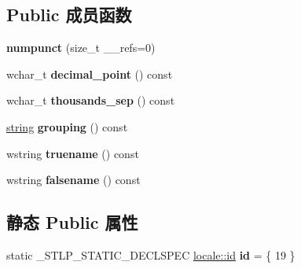 \subsection*{Public 成员函数}
\begin{DoxyCompactItemize}
\item 
\mbox{\label{classnumpunct_3_01wchar__t_01_4_a9940e35fb4fe67518dcb2ca24e023705}} 
{\bfseries numpunct} (size\+\_\+t \+\_\+\+\_\+refs=0)
\item 
\mbox{\label{classnumpunct_3_01wchar__t_01_4_a944a467d9a4a1d7c00e23ce2c0ad4da2}} 
wchar\+\_\+t {\bfseries decimal\+\_\+point} () const
\item 
\mbox{\label{classnumpunct_3_01wchar__t_01_4_ac67e3c8e73720e09c9d769c9a9d20077}} 
wchar\+\_\+t {\bfseries thousands\+\_\+sep} () const
\item 
\mbox{\label{classnumpunct_3_01wchar__t_01_4_a3029159f559230963236c4203cda9011}} 
\hyperlink{structstring}{string} {\bfseries grouping} () const
\item 
\mbox{\label{classnumpunct_3_01wchar__t_01_4_a66bfd5912c7beb5673ac2fb90b89c521}} 
wstring {\bfseries truename} () const
\item 
\mbox{\label{classnumpunct_3_01wchar__t_01_4_a9b58c525e17ce8534a2f0da1a0e833e6}} 
wstring {\bfseries falsename} () const
\end{DoxyCompactItemize}
\subsection*{静态 Public 属性}
\begin{DoxyCompactItemize}
\item 
\mbox{\label{classnumpunct_3_01wchar__t_01_4_a7068f9a6ad1847c3b8d454d0c33f4d58}} 
static \+\_\+\+S\+T\+L\+P\+\_\+\+S\+T\+A\+T\+I\+C\+\_\+\+D\+E\+C\+L\+S\+P\+EC \hyperlink{classlocale_1_1id}{locale\+::id} {\bfseries id} = \{ 19 \}
\end{DoxyCompactItemize}
